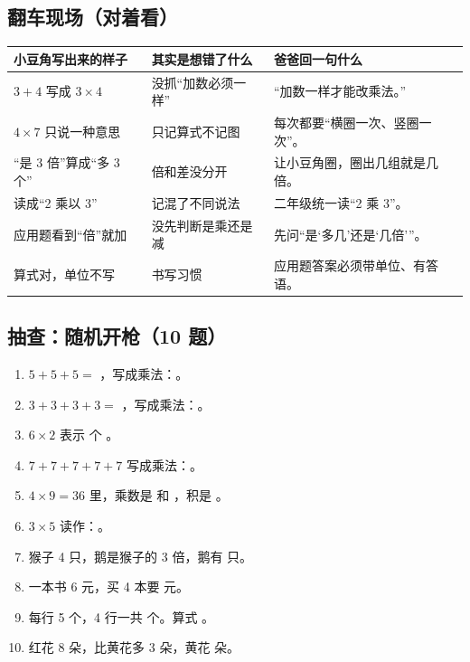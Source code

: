 \subsection{翻车现场（对着看）}

\begin{center}
\small
\begin{tabularx}{\linewidth}{@{}p{3.8cm}p{4.0cm}X@{}}
\toprule
\textbf{小豆角写出来的样子} & \textbf{其实是想错了什么} & \textbf{爸爸回一句什么} \\
\midrule
$3+4$ 写成 $3\times4$ & 没抓“加数必须一样” & “加数一样才能改乘法。” \\
\addlinespace[2pt]
$4\times7$ 只说一种意思 & 只记算式不记图 & 每次都要“横圈一次、竖圈一次”。 \\
\addlinespace[2pt]
“是 3 倍”算成“多 3 个” & 倍和差没分开 & 让小豆角圈，圈出几组就是几倍。 \\
\addlinespace[2pt]
读成“2 乘以 3” & 记混了不同说法 & 二年级统一读“2 乘 3”。 \\
\addlinespace[2pt]
应用题看到“倍”就加 & 没先判断是乘还是减 & 先问“是‘多几’还是‘几倍’”。 \\
\addlinespace[2pt]
算式对，单位不写 & 书写习惯 & 应用题答案必须带单位、有答语。 \\
\bottomrule
\end{tabularx}
\end{center}

\subsection{抽查：随机开枪（10 题）}

\begin{enumerate}[label=\arabic*.,itemsep=4pt]
  \item $5+5+5=$ \blank[1.4cm]，写成乘法：\blank[2.6cm]。
  \item $3+3+3+3=$ \blank[1.4cm]，写成乘法：\blank[2.6cm]。
  \item $6\times2$ 表示 \blank[1.4cm] 个 \blank[1.4cm]。
  \item $7+7+7+7+7$ 写成乘法：\blank[2.6cm]。
  \item $4\times9=36$ 里，乘数是 \blank[1.2cm] 和 \blank[1.2cm]，积是 \blank[1.2cm]。
  \item $3\times5$ 读作：\blank[3cm]。
  \item 猴子 4 只，鹅是猴子的 3 倍，鹅有 \blank[1.4cm] 只。
  \item 一本书 6 元，买 4 本要 \blank[1.4cm] 元。
  \item 每行 5 个，4 行一共 \blank[1.4cm] 个。算式 \blank[2.4cm]。
  \item 红花 8 朵，比黄花多 3 朵，黄花 \blank[1.4cm] 朵。
\end{enumerate}

